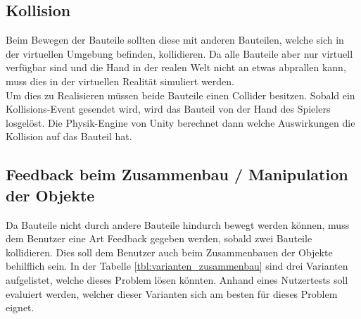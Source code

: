 \subsection{Kollision}
\label{ch:kollision}
Beim Bewegen der Bauteile sollten diese mit anderen Bauteilen, welche sich in der virtuellen Umgebung befinden, kollidieren. Da alle Bauteile aber nur virtuell verfügbar sind und die Hand in der realen Welt nicht an etwas abprallen kann, muss dies in der virtuellen Realität simuliert werden. \\
Um dies zu Realisieren müssen beide Bauteile einen Collider besitzen. Sobald ein Kollisions-Event gesendet wird, wird das Bauteil von der Hand des Spielers losgelöst. Die Physik-Engine von Unity berechnet dann welche Auswirkungen die Kollision auf das Bauteil hat.
	
\subsection{Feedback beim Zusammenbau / Manipulation der Objekte}
\label{ch:feedback_zusammenbau_konzepte}
Da Bauteile nicht durch andere Bauteile hindurch bewegt werden können, muss dem Benutzer eine Art Feedback gegeben werden, sobald zwei Bauteile kollidieren. Dies soll dem Benutzer auch beim Zusammenbauen der Objekte behilflich sein. In der Tabelle \ref{tbl:varianten_zusammenbau} sind drei Varianten aufgelistet, welche dieses Problem lösen könnten. Anhand eines Nutzertests soll evaluiert werden, welcher dieser Varianten sich am besten für dieses Problem eignet.
	
